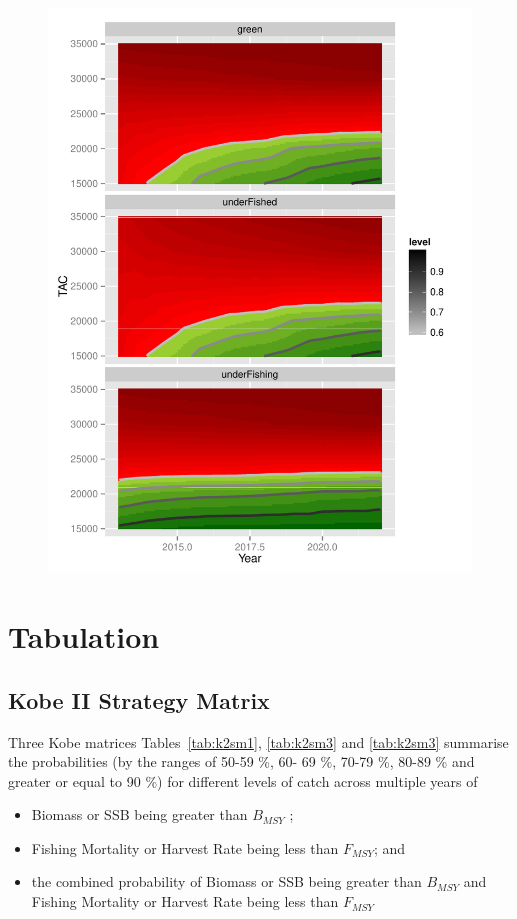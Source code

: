 \documentclass[shortnames,nojss,article]{jss}
\begin{document}
\begin{figure}
\begin{center}
\includegraphics{kobe-025}
\end{center}\end{figure}


\clearpage
\section{Tabulation}

\subsection{Kobe II Strategy Matrix}

Three Kobe matrices Tables~\ref{tab:k2sm1}, \ref{tab:k2sm3} and \ref{tab:k2sm3} summarise the probabilities (by the ranges 
of 50-59 \%, 60- 69 \%, 70-79 \%, 80-89 \% and greater or equal to 90 \%) for different levels of catch across multiple years of 

\begin{itemize}
 \item  Biomass or SSB being greater than $B_{MSY}$ ;
 \item  Fishing Mortality or Harvest Rate being less than $F_{MSY}$; and 
 \item  the combined probability of Biomass or SSB being greater than $B_{MSY}$ and Fishing Mortality or Harvest Rate being less than $F_{MSY}$ 
\end{itemize}
\end{document}
